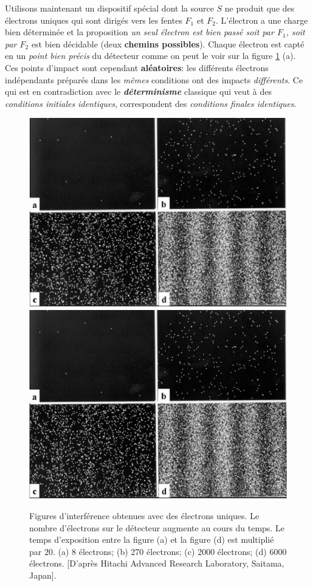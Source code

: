 Utilisons maintenant un dispositif spécial dont la source $S$ ne produit que des 
électrons uniques qui sont dirigés vers les fentes $F_1$ et $F_2$. L'électron a 
une charge bien déterminée et la proposition \emph{un seul électron est bien 
passé soit par $F_1$, soit par $F_2$} est bien décidable (deux \textbf{chemins 
possibles}). Chaque électron est capté en un \emph{point bien précis} du 
détecteur comme on peut le voir sur la figure \ref{fig:InterfPhotons} (a). Ces 
points d'impact sont cependant \textbf{aléatoires}: les différents électrons 
indépendants préparés dans les \emph{mêmes} conditions ont des impacts 
\emph{différents}. Ce qui est en contradiction avec le 
\textbf{\emph{déterminisme}} classique qui veut à des \emph{conditions initiales 
identiques}, correspondent des \emph{conditions finales identiques}.

\begin{figure}[htbp]
\centering
\ifcase\msipdfoutput
  \includegraphics[scale=1]{graphics/InterfPhotons.eps}%
\else
  \includegraphics[scale=1]{graphics/InterfPhotons.pdf}%
\fi
\caption{Figures d'interférence obtenues avec des électrons uniques. Le nombre
d'électrons sur le détecteur augmente au cours du temps. Le temps d'exposition
entre la figure (a) et la figure (d) est multiplié par $20$. (a) 8 électrons;
(b) 270 électrons; (c) 2000 électrons; (d) 6000 électrons. [D'après Hitachi
Advanced Research Laboratory, Saitama, Japan].}%
\label{fig:InterfPhotons}%
\end{figure}

